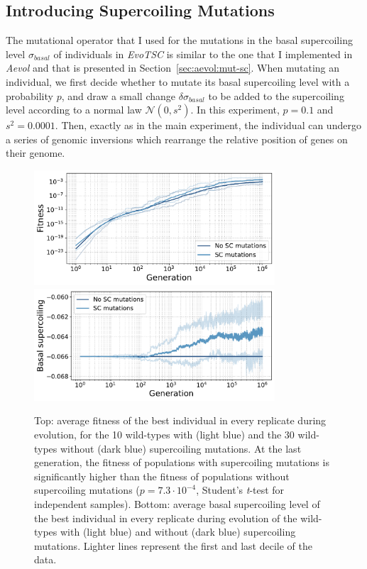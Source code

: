\subsection{Introducing Supercoiling Mutations}

The mutational operator that I used for the mutations in the basal supercoiling level $\sigma_{basal}$ of individuals in \emph{EvoTSC} is similar to the one that I implemented in \emph{Aevol} and that is presented in Section~\ref{sec:aevol:mut-sc}.
When mutating an individual, we first decide whether to mutate its basal supercoiling level with a probability $p$, and draw a small change $\delta\sigma_{basal}$ to be added to the supercoiling level according to a normal law $\mathcal{N}(0, s^2)$.
In this experiment, $p=0.1$ and $s^2=0.0001$.
Then, exactly as in the main experiment, the individual can undergo a series of genomic inversions which rearrange the relative position of genes on their genome.

\begin{figure}
\centering
\includegraphics[width=0.8\textwidth]{epistasis/img/wt-with-sc/fitness_all_with_main.pdf}
\includegraphics[width=0.8\textwidth]{epistasis/img/wt-with-sc/basal_sc_all.pdf}
\caption[Average basal supercoiling and fitness during evolution of the wild-types, with basal supercoiling level mutations]{Top: average fitness of the best individual in every replicate during evolution, for the 10 wild-types with (light blue) and the 30 wild-types without (dark blue) supercoiling mutations.
At the last generation, the fitness of populations with supercoiling mutations is significantly higher than the fitness of populations without supercoiling mutations ($p = 7.3\cdot10^{-4}$, Student's \emph{t}-test for independent samples).
Bottom: average basal supercoiling level of the best individual in every replicate during evolution of the wild-types with (light blue) and without (dark blue) supercoiling mutations.
Lighter lines represent the first and last decile of the data.}
\label{fig:epistasis:wt-evolution}
\end{figure}


